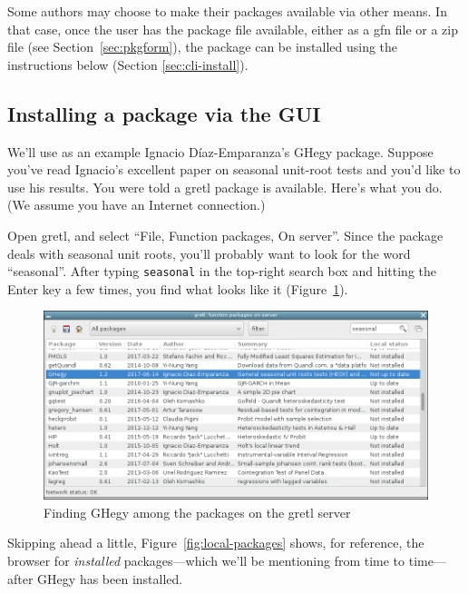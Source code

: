 \documentclass[oneside]{book}
\begin{document}
Some authors may choose to make their packages available via other
means. In that case, once the user has the package file available,
either as a \textsf{gfn} file or a \textsf{zip} file (see
Section~\ref{sec:pkgform}), the package can be installed using
the instructions below (Section \ref{sec:cli-install}).

\subsection{Installing a package via the GUI}
\label{sec:gui-install}

We'll use as an example Ignacio D\'iaz-Emparanza's \textsf{GHegy}
package.  Suppose you've read Ignacio's excellent paper on seasonal
unit-root tests \citep{Ignacio-HEGY} and you'd like to use his
results. You were told a gretl package is available. Here's what you
do. (We assume you have an Internet connection.)

Open gretl, and select ``File, Function packages, On server''. Since
the package deals with seasonal unit roots, you'll probably want to
look for the word ``seasonal''. After typing \texttt{seasonal} in the
top-right search box and hitting the \textsf{Enter} key a few times,
you find what looks like it (Figure~\ref{fig:ghegy-lst}).

\begin{figure}[htbp]
\begin{center}
  \includegraphics[scale=0.5]{figures/ghegy-lst.png}
\end{center}
\caption{Finding GHegy among the packages on the gretl server}
\label{fig:ghegy-lst}
\end{figure}

Skipping ahead a little, Figure~\ref{fig:local-packages} shows, for
reference, the browser for \textit{installed} packages---which we'll
be mentioning from time to time---after \textsf{GHegy} has been
installed.
\end{document}

